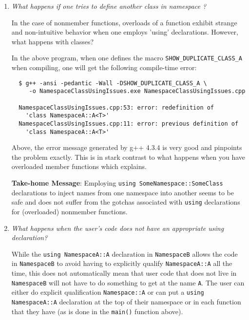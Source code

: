 \begin{enumerate}

{}\item\textit{What happens if one tries to define another class
{} in namespace {}?}

In the case of nonmember functions, overloads of a function exhibit strange
and non-intuitive behavior when one employs 'using' declarations.  However,
what happens with classes?

In the above program, when one defines the macro
{}\texttt{SHOW\-\_DUPLICATE\-\_CLASS\-\_A} when compiling, one will get the
following compile-time error:

{\small\begin{verbatim}
  $ g++ -ansi -pedantic -Wall -DSHOW_DUPLICATE_CLASS_A \
     -o NamespaceClassUsingIssues.exe NamespaceClassUsingIssues.cpp             

  NamespaceClassUsingIssues.cpp:53: error: redefinition of
    'class NamespaceA::A<T>'
  NamespaceClassUsingIssues.cpp:11: error: previous definition of
    'class NamespaceA::A<T>'
\end{verbatim}}

Above, the error message generated by g++ 4.3.4 is very good and
pinpoints the problem exactly.  This is in stark contrast to what
happens when you have overloaded member functions which {}\cite[Item
59]{C++CodingStandards05} explains.

{}\textbf{Take-home Message}: Employing {}\texttt{using
SomeNamespace::SomeClass} declarations to inject names from one
namespace into another seems to be safe and does not suffer from the
gotchas associated with {}\texttt{using} declarations for (overloaded)
nonmember functions.

{}\item\textit{What happens when the user's code does not have an
appropriate using declaration?}

While the {}\texttt{using NamespaceA::A} declaration in {}\texttt{NamespaceB}
allows the code in {}\texttt{NamespaceB} to avoid having to explicitly qualify
{}\texttt{NamespaceA::A} all the time, this does not automatically mean that
user code that does not live in {}\texttt{NamespaceB} will not have to do
something to get at the name {}\texttt{A}.  The user can either do explicit
qualification {}\texttt{Namespace::A} or can put a {}\texttt{using
NamespaceA::A} declaration at the top of their namespace or in each function
that they have (as is done in the {}\texttt{main()} function above).


\end{enumerate}
